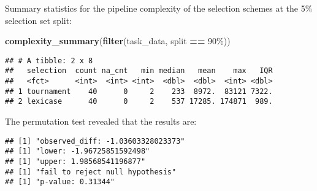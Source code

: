 \documentclass[
]{book}
\newenvironment{Shaded}{\begin{snugshade}}{\end{snugshade}}
\newcommand{\AttributeTok}[1]{\textcolor[rgb]{0.13,0.29,0.53}{#1}}
\newcommand{\DecValTok}[1]{\textcolor[rgb]{0.00,0.00,0.81}{#1}}
\newcommand{\FunctionTok}[1]{\textcolor[rgb]{0.13,0.29,0.53}{\textbf{#1}}}
\newcommand{\NormalTok}[1]{#1}
\newcommand{\OtherTok}[1]{\textcolor[rgb]{0.56,0.35,0.01}{#1}}
\newcommand{\SpecialCharTok}[1]{\textcolor[rgb]{0.81,0.36,0.00}{\textbf{#1}}}
\newcommand{\StringTok}[1]{\textcolor[rgb]{0.31,0.60,0.02}{#1}}
\begin{document}
Summary statistics for the pipeline complexity of the selection schemes at the 5\% selection set split:

\begin{Shaded}
\begin{Highlighting}[]
\FunctionTok{complexity\_summary}\NormalTok{(}\FunctionTok{filter}\NormalTok{(task\_data, split }\SpecialCharTok{==} \StringTok{\textquotesingle{}90\%\textquotesingle{}}\NormalTok{))}
\end{Highlighting}
\end{Shaded}

\begin{verbatim}
## # A tibble: 2 x 8
##   selection  count na_cnt   min median   mean    max   IQR
##   <fct>      <int>  <int> <int>  <dbl>  <dbl>  <int> <dbl>
## 1 tournament    40      0     2    233  8972.  83121 7322.
## 2 lexicase      40      0     2    537 17285. 174871  989.
\end{verbatim}

The permutation test revealed that the results are:

\begin{Shaded}
\end{Shaded}

\begin{verbatim}
## [1] "observed_diff: -1.03603328023373"
## [1] "lower: -1.96725851592498"
## [1] "upper: 1.98568541196877"
## [1] "fail to reject null hypothesis"
## [1] "p-value: 0.31344"
\end{verbatim}
\end{document}
